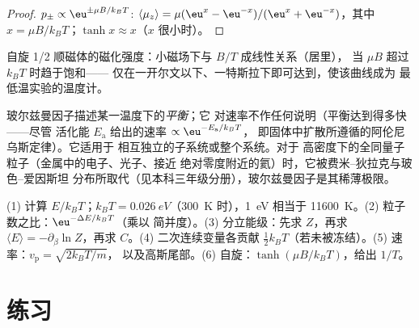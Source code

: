 \begin{proof}
$p_\pm \propto\eu^{\pm\mu B/k_BT}$: $\langle\mu_z\rangle = \mu(\eu^x - \eu^{-x})/(\eu^x +
\eu^{-x})$，其中 $x = \mu B/k_BT$；$\tanh x \approx x$（$x$ 很小时）。
\end{proof}

\begin{omfigure}

{\small 自旋 1/2 顺磁体的磁化强度：小磁场下与 $B/T$ 成线性关系（居里），
当 $\mu B$ 超过 $k_BT$ 时趋于饱和——
仅在一开尔文以下、一特斯拉下即可达到，使该曲线成为
最低温实验的温度计。}
\end{omfigure}

\begin{remark}[该因子的局限]\label{rem:b2:boltzmann-factor:limits}
玻尔兹曼因子描述某一温度下的\emph{平衡}；它
对速率不作任何说明（平衡达到得多快——尽管
活化能 $E_{\text{a}}$ 给出的速率 $\propto\eu^{-E_{\text{a}}/k_BT}$，
即固体中扩散所遵循的阿伦尼乌斯定律）。它适用于
相互独立的子系统或整个系统。对于
高密度下的全同量子粒子（金属中的电子、光子、接近
绝对零度附近的氦）时，它被费米–狄拉克与玻色–爱因斯坦
分布所取代（见本科三年级分册），玻尔兹曼因子是其稀薄极限。
\end{remark}

\begin{method}[玻尔兹曼估算]\label{meth:b2:boltzmann-factor:method}
(1) 计算 $E/k_BT$；$k_BT = \qty{0.026}{eV}$（\qty{300}{K} 时），\qty{1}{eV}
相当于 \qty{11600}{K}。(2) 粒子数之比：$\eu^{-\Delta E/k_BT}$（乘以
简并度）。(3) 分立能级：先求 $Z$，再求 $\langle E\rangle =
-\partial_\beta\ln Z$，再求 $C$。(4) 二次连续变量各贡献
$\tfrac12k_BT$（若未被冻结）。(5) 速率：$v_{\text{p}} = \sqrt{2k_BT/m}$，
以及高斯尾部。(6) 自旋：$\tanh(\mu B/k_BT)$，给出 $1/T$。
\end{method}

\section{练习}

